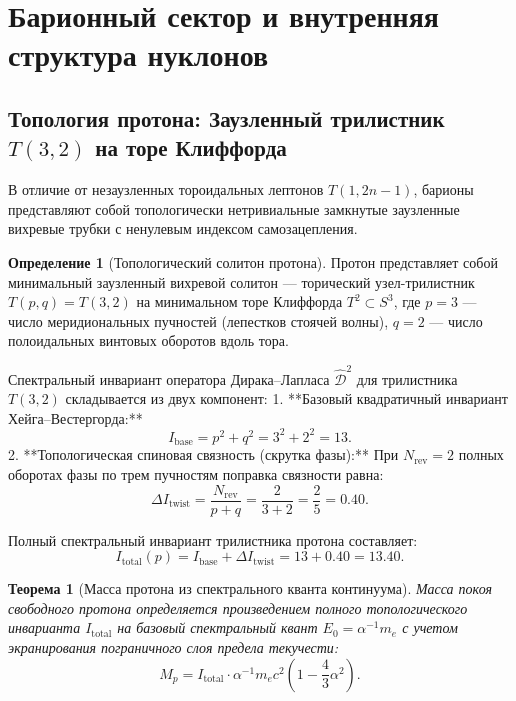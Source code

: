 \documentclass[11pt,a4paper,oneside]{article}
\theoremstyle{plain}
\newtheorem{theorem}{Теорема}[section]
\theoremstyle{definition}
\newtheorem{definition}{Определение}[section]
\theoremstyle{remark}
\numberwithin{equation}{section}
\begin{document}
	\section{Барионный сектор и внутренняя структура нуклонов}
	
	\subsection{Топология протона: Заузленный трилистник $T(3,2)$ на торе Клиффорда}
	
	В отличие от незаузленных тороидальных лептонов $T(1, 2n-1)$, барионы представляют собой топологически нетривиальные замкнутые заузленные вихревые трубки с ненулевым индексом самозацепления.
	
	\begin{definition}[Топологический солитон протона]
		Протон представляет собой минимальный заузленный вихревой солитон — торический узел-трилистник $T(p,q) = T(3,2)$ на минимальном торе Клиффорда $T^2 \subset S^3$, где $p = 3$ — число меридиональных пучностей (лепестков стоячей волны), $q = 2$ — число полоидальных винтовых оборотов вдоль тора.
	\end{definition}
	
	Спектральный инвариант оператора Дирака--Лапласа $\hat{\mathcal{D}}^2$ для трилистника $T(3,2)$ складывается из двух компонент:
	1. **Базовый квадратичный инвариант Хейга--Вестергорда:**
	\begin{equation}
		I_{\text{base}} = p^2 + q^2 = 3^2 + 2^2 = 13.
	\end{equation}
	2. **Топологическая спиновая связность (скрутка фазы):**
	При $N_{\text{rev}} = 2$ полных оборотах фазы по трем пучностям поправка связности равна:
	\begin{equation}
		\Delta I_{\text{twist}} = \frac{N_{\text{rev}}}{p + q} = \frac{2}{3 + 2} = \frac{2}{5} = 0.40.
	\end{equation}
	
	Полный спектральный инвариант трилистника протона составляет:
	\begin{equation}
		I_{\text{total}}(p) = I_{\text{base}} + \Delta I_{\text{twist}} = 13 + 0.40 = \mathbf{13.40}.
	\end{equation}
	
	\begin{theorem}[Масса протона из спектрального кванта континуума]
		Масса покоя свободного протона определяется произведением полного топологического инварианта $I_{\text{total}}$ на базовый спектральный квант $E_0 = \alpha^{-1} m_e$ с учетом экранирования пограничного слоя предела текучести:
		\begin{equation}
			M_p = I_{\text{total}} \cdot \alpha^{-1} m_e c^2 \left( 1 - \frac{4}{3}\alpha^2 \right).
			\label{eq:proton_mass_exact}
		\end{equation}
	\end{theorem}
	
\end{document}
